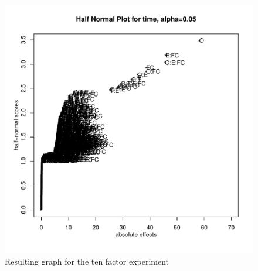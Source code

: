 \documentclass{llncs}
\begin{document}
\begin{figure}
 \includegraphics[width=14cm]{10factorAvarageDanielPlot.pdf}
  \caption{Resulting graph for the ten factor experiment}\label{10factorGraph}
\end{figure}



\end{document}
